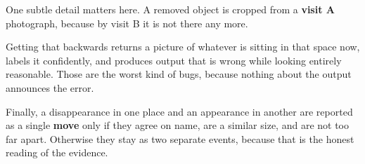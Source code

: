 One subtle detail matters here. A removed object is cropped from a \textbf{visit A} photograph,
because by visit B it is not there any more.

\begin{watch}
Getting that backwards returns a picture of whatever is sitting in that space now, labels it
confidently, and produces output that is wrong while looking entirely reasonable. Those are the
worst kind of bugs, because nothing about the output announces the error.
\end{watch}

Finally, a disappearance in one place and an appearance in another are reported as a single
\textbf{move} only if they agree on name, are a similar size, and are not too far apart. Otherwise
they stay as two separate events, because that is the honest reading of the evidence.
